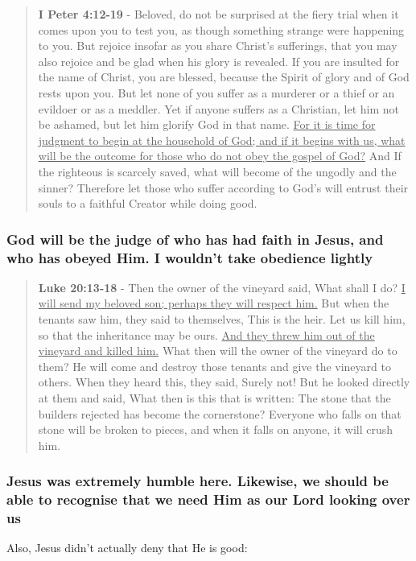 \documentclass[11pt]{article}
\begin{document}
\begin{quote}
\textbf{I Peter 4:12-19} - Beloved, do not be surprised at the fiery trial when it comes upon you to test you, as though something strange were happening to you. But rejoice insofar as you share Christ's sufferings, that you may also rejoice and be glad when his glory is revealed. If you are insulted for the name of Christ, you are blessed, because the Spirit of glory and of God rests upon you. But let none of you suffer as a murderer or a thief or an evildoer or as a meddler. Yet if anyone suffers as a Christian, let him not be ashamed, but let him glorify God in that name. \uline{For it is time for judgment to begin at the household of God; and if it begins with us, what will be the outcome for those who do not obey the gospel of God?} And If the righteous is scarcely saved, what will become of the ungodly and the sinner? Therefore let those who suffer according to God's will entrust their souls to a faithful Creator while doing good.
\end{quote}

\subsubsection{God will be the judge of who has had faith in Jesus, and who has obeyed Him. I wouldn't take obedience lightly}
\label{sec:org8f8f167}
\begin{quote}
\textbf{Luke 20:13-18} - Then the owner of the vineyard said, What shall I do? \uline{I will send my beloved son; perhaps they will respect him.} But when the tenants saw him, they said to themselves, This is the heir. Let us kill him, so that the inheritance may be ours. \uline{And they threw him out of the vineyard and killed him.} What then will the owner of the vineyard do to them? He will come and destroy those tenants and give the vineyard to others. When they heard this, they said, Surely not! But he looked directly at them and said, What then is this that is written: The stone that the builders rejected has become the cornerstone? Everyone who falls on that stone will be broken to pieces, and when it falls on anyone, it will crush him.
\end{quote}

\subsubsection{Jesus was extremely humble here. Likewise, we should be able to recognise that we need Him as our Lord looking over us}
\label{sec:org21f8e25}
Also, Jesus didn't actually deny that He is good:
\end{document}
